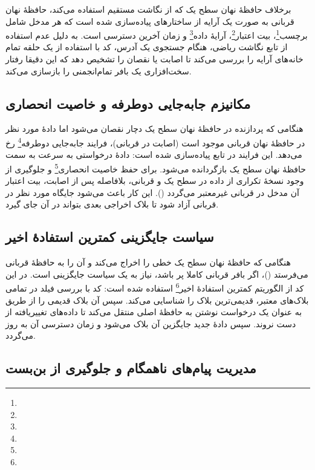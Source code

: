 برخلاف حافظهٔ نهان سطح یک که از نگاشت مستقیم استفاده می‌کند، حافظهٔ نهان قربانی به صورت یک آرایه از ساختارهای  پیاده‌سازی شده است که هر مدخل شامل برچسب\footnote{}، بیت اعتبار\footnote{}، آرایهٔ داده\footnote{} و زمان آخرین دسترسی است. به دلیل عدم استفاده از تابع نگاشت ریاضی، هنگام جستجوی یک آدرس، کد با استفاده از یک حلقه تمام خانه‌های آرایه را بررسی می‌کند تا اصابت یا نقصان را تشخیص دهد که این دقیقا رفتار سخت‌افزاری یک بافر تمام‌انجمنی را بازسازی می‌کند.

\subsection{مکانیزم جابه‌جایی دوطرفه و خاصیت انحصاری}

هنگامی که پردازنده در حافظهٔ نهان سطح یک دچار نقصان می‌شود اما دادهٔ مورد نظر در حافظهٔ نهان قربانی موجود است (اصابت در قربانی)، فرایند جابه‌جایی دوطرفه\footnote{} رخ می‌دهد. این فرایند در تابع  پیاده‌سازی شده است:
دادهٔ درخواستی به سرعت به سمت حافظهٔ نهان سطح یک بازگردانده می‌شود. برای حفظ خاصیت انحصاری\footnote{} و جلوگیری از وجود نسخهٔ تکراری از داده در سطح یک و قربانی، بلافاصله پس از اصابت، بیت اعتبار آن مدخل در قربانی غیرمعتبر می‌گردد (). این کار باعث می‌شود جایگاه مورد نظر در قربانی آزاد شود تا بلاک اخراجی بعدی بتواند در آن جای گیرد.

\subsection{سیاست جایگزینی کمترین استفادهٔ اخیر}

هنگامی که حافظهٔ نهان سطح یک خطی را اخراج می‌کند و آن را به حافظهٔ قربانی می‌فرستد ()، اگر بافر قربانی کاملا پر باشد، نیاز به یک سیاست جایگزینی است. در این کد از الگوریتم کمترین استفادهٔ اخیر\footnote{} استفاده شده است:
کد با بررسی فیلد  در تمامی بلاک‌های معتبر، قدیمی‌ترین بلاک را شناسایی می‌کند. سپس آن بلاک قدیمی را از طریق  به عنوان یک درخواست نوشتن به حافظهٔ اصلی منتقل می‌کند تا داده‌های تغییریافته از دست نروند. سپس دادهٔ جدید جایگزین آن بلاک می‌شود و زمان دسترسی آن به روز می‌گردد.

\subsection{مدیریت پیام‌های ناهمگام و جلوگیری از بن‌بست}

